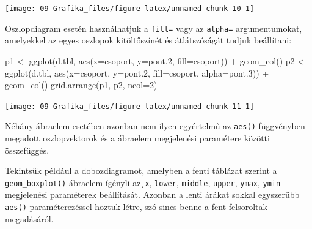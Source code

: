 \documentclass[
]{book}
\newenvironment{Shaded}{\begin{snugshade}}{\end{snugshade}}
\newcommand{\AttributeTok}[1]{\textcolor[rgb]{0.77,0.63,0.00}{#1}}
\newcommand{\DecValTok}[1]{\textcolor[rgb]{0.00,0.00,0.81}{#1}}
\newcommand{\FloatTok}[1]{\textcolor[rgb]{0.00,0.00,0.81}{#1}}
\newcommand{\FunctionTok}[1]{\textcolor[rgb]{0.00,0.00,0.00}{#1}}
\newcommand{\NormalTok}[1]{#1}
\newcommand{\OtherTok}[1]{\textcolor[rgb]{0.56,0.35,0.01}{#1}}
\newcommand{\SpecialCharTok}[1]{\textcolor[rgb]{0.00,0.00,0.00}{#1}}
\begin{document}
\begin{center}\texttt{[image: 09-Grafika\_files/figure-latex/unnamed-chunk-10-1]} \end{center}

Oszlopdiagram esetén használhatjuk a \texttt{fill=} vagy az \texttt{alpha=} argumentumokat, amelyekkel az egyes oszlopok kitöltőszínét és átlátszóságát tudjuk beállítani:

\begin{Shaded}
\begin{Highlighting}[]
\NormalTok{p1 }\OtherTok{\textless{}{-}} \FunctionTok{ggplot}\NormalTok{(d.tbl, }\FunctionTok{aes}\NormalTok{(}\AttributeTok{x=}\NormalTok{csoport, }\AttributeTok{y=}\NormalTok{pont}\FloatTok{.2}\NormalTok{, }\AttributeTok{fill=}\NormalTok{csoport)) }\SpecialCharTok{+} \FunctionTok{geom\_col}\NormalTok{()}
\NormalTok{p2 }\OtherTok{\textless{}{-}} \FunctionTok{ggplot}\NormalTok{(d.tbl, }\FunctionTok{aes}\NormalTok{(}\AttributeTok{x=}\NormalTok{csoport, }\AttributeTok{y=}\NormalTok{pont}\FloatTok{.2}\NormalTok{, }\AttributeTok{fill=}\NormalTok{csoport, }\AttributeTok{alpha=}\NormalTok{pont}\FloatTok{.3}\NormalTok{)) }\SpecialCharTok{+} \FunctionTok{geom\_col}\NormalTok{()}
\FunctionTok{grid.arrange}\NormalTok{(p1, p2, }\AttributeTok{ncol=}\DecValTok{2}\NormalTok{)}
\end{Highlighting}
\end{Shaded}

\begin{center}\texttt{[image: 09-Grafika\_files/figure-latex/unnamed-chunk-11-1]} \end{center}

Néhány ábraelem esetében azonban nem ilyen egyértelmű az \texttt{aes()} függvényben megadott oszlopvektorok és a ábraelem megjelenési paramétere közötti összefüggés.

Tekintsük például a dobozdiagramot, amelyben a fenti táblázat szerint a \texttt{geom\_boxplot()} ábraelem ígényli az˛\texttt{x}, \texttt{lower}, \texttt{middle}, \texttt{upper}, \texttt{ymax}, \texttt{ymin} megjelenési paraméterek beállítását. Azonban a lenti árákat sokkal egyszerűbb \texttt{aes()} paraméterezéssel hoztuk létre, szó sincs benne a fent felsoroltak megadásáról.
\end{document}
